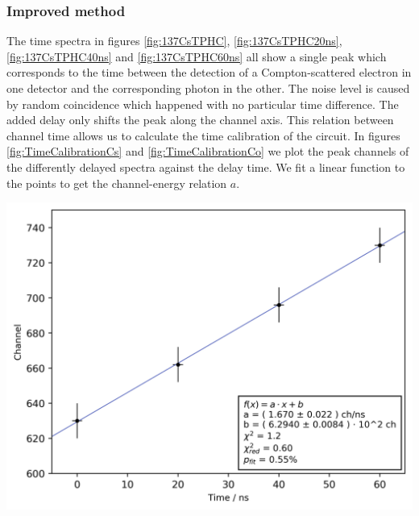 \subsubsection{Improved method}
%
The time spectra in figures \ref{fig:137CsTPHC}, \ref{fig:137CsTPHC20ns}, \ref{fig:137CsTPHC40ns} and \ref{fig:137CsTPHC60ns} all show a single peak which corresponds to the time between the detection of a Compton-scattered electron in one detector and the corresponding photon in the other.
The noise level is caused by random coincidence which happened with no particular time difference.
The added delay only shifts the peak along the channel axis.
This relation between channel time allows us to calculate the time calibration of the circuit.
In figures \ref{fig:TimeCalibrationCs} and \ref{fig:TimeCalibrationCo} we plot the peak channels of the differently delayed spectra against the delay time.
We fit a linear function to the points to get the channel-energy relation $a$.
%
\par
%
\minipage{\linewidth}
    \begin{center}
        \captionsetup{type=figure}
        \begin{adjustbox}{max width=\linewidth, keepaspectratio}
            \includegraphics[]{png/time_calibration-cs}
        \end{adjustbox}
        \label{fig:TimeCalibrationCs}
    \end{center}
\endminipage
%
\par
%
\minipage{\linewidth}
